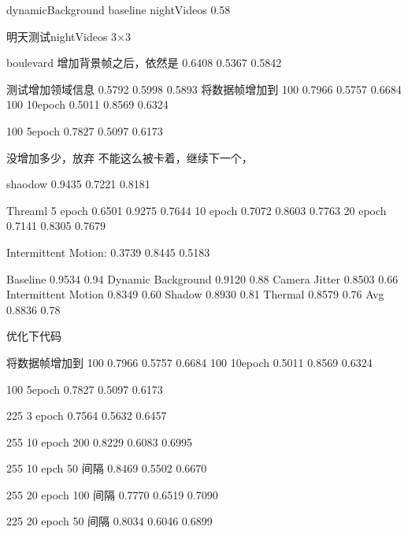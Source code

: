 dynamicBackground
baseline
nightVideos 0.58

明天测试nightVideos 3×3

boulevard
增加背景帧之后，依然是
    0.6408    0.5367    0.5842

    测试增加领域信息
    0.5792    0.5998    0.5893
将数据帧增加到 100
    0.7966    0.5757    0.6684
100 10epoch
    0.5011    0.8569    0.6324

100 5epoch
    0.7827    0.5097    0.6173


没增加多少，放弃
    不能这么被卡着，继续下一个，

shaodow
    0.9435    0.7221    0.8181

Threaml 5 epoch
    0.6501    0.9275    0.7644
    10 epoch
    0.7072    0.8603    0.7763
    20 epoch
    0.7141    0.8305    0.7679

Intermittent Motion:
    0.3739    0.8445    0.5183


Baseline	            0.9534	    0.94
Dynamic Background	    0.9120	    0.88
Camera Jitter	        0.8503	    0.66
Intermittent Motion	    0.8349	    0.60
Shadow	                0.8930	    0.81
Thermal	                0.8579	    0.76
Avg                     0.8836      0.78

优化下代码


将数据帧增加到 100
    0.7966    0.5757    0.6684
100 10epoch
    0.5011    0.8569    0.6324

100 5epoch
    0.7827    0.5097    0.6173

225 3 epoch 
    0.7564    0.5632    0.6457

255 10 epoch 200 
    0.8229    0.6083    0.6995

255 10 epch 50 间隔
    0.8469    0.5502    0.6670

255 20 epoch 100 间隔
    0.7770    0.6519    0.7090

225 20 epoch 50 间隔
    0.8034    0.6046    0.6899
